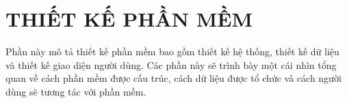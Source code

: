 \chapter{THIẾT KẾ PHẦN MỀM}

Phần này mô tả thiết kế phần mềm bao gồm thiết kế hệ thống, thiết kế dữ liệu và thiết kế giao diện người dùng. Các phần này sẽ trình bày một cái nhìn tổng quan về cách phần mềm được cấu trúc, cách dữ liệu được tổ chức và cách người dùng sẽ tương tác với phần mềm.



